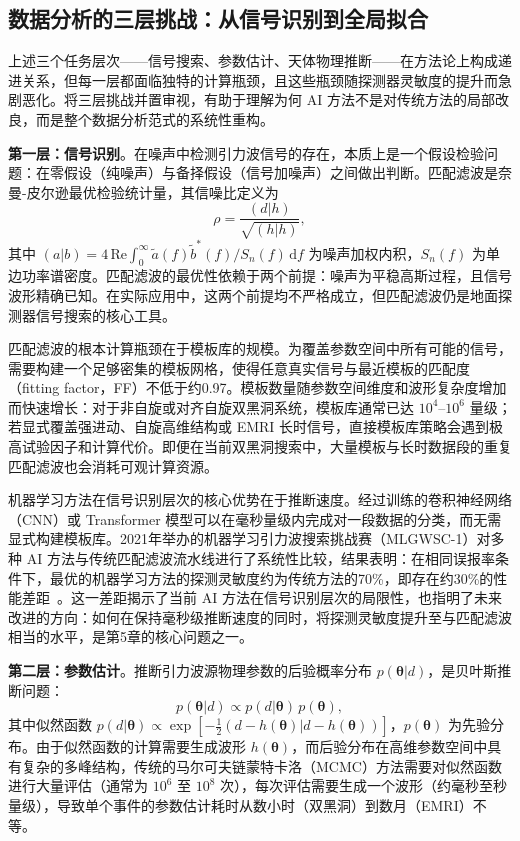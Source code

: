 \subsection{数据分析的三层挑战：从信号识别到全局拟合}

上述三个任务层次——信号搜索、参数估计、天体物理推断——在方法论上构成递进关系，但每一层都面临独特的计算瓶颈，且这些瓶颈随探测器灵敏度的提升而急剧恶化。将三层挑战并置审视，有助于理解为何 AI 方法不是对传统方法的局部改良，而是整个数据分析范式的系统性重构。

\textbf{第一层：信号识别}。在噪声中检测引力波信号的存在，本质上是一个假设检验问题：在零假设（纯噪声）与备择假设（信号加噪声）之间做出判断。匹配滤波是奈曼-皮尔逊最优检验统计量，其信噪比定义为
\begin{equation}
\rho = \frac{(d | h)}{\sqrt{(h | h)}},
\end{equation}
其中 $(a|b) = 4\,\text{Re}\int_0^\infty \tilde{a}(f)\tilde{b}^*(f)/S_n(f)\,\mathrm{d}f$ 为噪声加权内积，$S_n(f)$ 为单边功率谱密度。匹配滤波的最优性依赖于两个前提：噪声为平稳高斯过程，且信号波形精确已知。在实际应用中，这两个前提均不严格成立，但匹配滤波仍是地面探测器信号搜索的核心工具。

匹配滤波的根本计算瓶颈在于模板库的规模。为覆盖参数空间中所有可能的信号，需要构建一个足够密集的模板网格，使得任意真实信号与最近模板的匹配度（fitting factor，FF）不低于约0.97。模板数量随参数空间维度和波形复杂度增加而快速增长：对于非自旋或对齐自旋双黑洞系统，模板库通常已达 $10^4$--$10^6$ 量级；若显式覆盖强进动、自旋高维结构或 EMRI 长时信号，直接模板库策略会遇到极高试验因子和计算代价。即便在当前双黑洞搜索中，大量模板与长时数据段的重复匹配滤波也会消耗可观计算资源。

机器学习方法在信号识别层次的核心优势在于推断速度。经过训练的卷积神经网络（CNN）或 Transformer 模型可以在毫秒量级内完成对一段数据的分类，而无需显式构建模板库。2021年举办的机器学习引力波搜索挑战赛（MLGWSC-1）对多种 AI 方法与传统匹配滤波流水线进行了系统性比较，结果表明：在相同误报率条件下，最优的机器学习方法的探测灵敏度约为传统方法的70\%，即存在约30\%的性能差距~\cite{schafer2023mlgwsc1}。这一差距揭示了当前 AI 方法在信号识别层次的局限性，也指明了未来改进的方向：如何在保持毫秒级推断速度的同时，将探测灵敏度提升至与匹配滤波相当的水平，是第5章的核心问题之一。

\textbf{第二层：参数估计}。推断引力波源物理参数的后验概率分布 $p(\boldsymbol{\theta}|d)$，是贝叶斯推断问题：
\begin{equation}
p(\boldsymbol{\theta}|d) \propto p(d|\boldsymbol{\theta})\,p(\boldsymbol{\theta}),
\end{equation}
其中似然函数 $p(d|\boldsymbol{\theta}) \propto \exp\!\left[-\frac{1}{2}(d - h(\boldsymbol{\theta})|d - h(\boldsymbol{\theta}))\right]$，$p(\boldsymbol{\theta})$ 为先验分布。由于似然函数的计算需要生成波形 $h(\boldsymbol{\theta})$，而后验分布在高维参数空间中具有复杂的多峰结构，传统的马尔可夫链蒙特卡洛（MCMC）方法需要对似然函数进行大量评估（通常为 $10^6$ 至 $10^8$ 次），每次评估需要生成一个波形（约毫秒至秒量级），导致单个事件的参数估计耗时从数小时（双黑洞）到数月（EMRI）不等。

